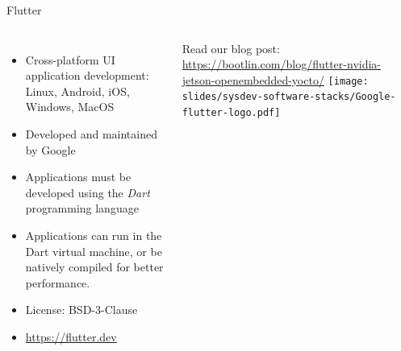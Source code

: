 \begin{frame}{Flutter}
  \begin{columns}
    \begin{itemize}
    \item Cross-platform UI application development: Linux, Android,
      iOS, Windows, MacOS
    \item Developed and maintained by Google
    \item Applications must be developed using the {\em Dart}
      programming language
    \item Applications can run in the Dart virtual machine, or be
      natively compiled for better performance.
    \item License: BSD-3-Clause
    \item \url{https://flutter.dev}
    \end{itemize}
    Read our blog post:
    \url{https://bootlin.com/blog/flutter-nvidia-jetson-openembedded-yocto/}
    \texttt{[image: slides/sysdev-software-stacks/Google-flutter-logo.pdf]}\\
    \vspace{0.5cm}

\end{columns}
\end{frame}

